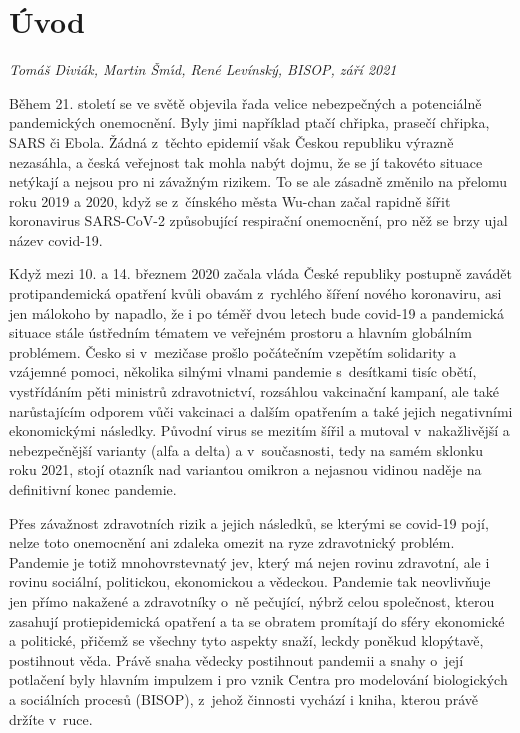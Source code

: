 \chapter*{Úvod}

\textit{Tomáš Diviák, Martin \v Sm\'\i d, René Levínský, BISOP, září 2021}
\vspace{15mm}

Během 21. století se ve světě objevila řada velice nebezpečných a potenciálně pandemických onemocnění. Byly jimi například ptačí chřipka, prasečí chřipka, SARS či Ebola. Žádná z~těchto epidemií však Českou republiku výrazně nezasáhla, a česká veřejnost tak mohla nabýt dojmu, že se jí takovéto situace netýkají a nejsou pro ni závažným rizikem. To se ale zásadně změnilo na přelomu roku 2019 a 2020, když se z~čínského města Wu-chan začal rapidně šířit koronavirus SARS-CoV-2 způsobující respirační onemocnění, pro něž se brzy ujal název covid-19.

Když mezi 10. a 14. březnem 2020 začala vláda České republiky postupně zavádět protipandemická opatření kvůli obavám z~rychlého šíření nového koronaviru, asi jen málokoho by napadlo, že i po téměř dvou letech bude covid-19 a pandemická situace stále ústředním tématem ve veřejném prostoru a hlavním globálním problémem. Česko si v~mezičase prošlo počátečním vzepětím solidarity a vzájemné pomoci, několika silnými vlnami pandemie s~desítkami tisíc obětí, vystřídáním pěti ministrů zdravotnictví, rozsáhlou vakcinační kampaní, ale také narůstajícím odporem vůči vakcinaci a dalším opatřením a také jejich negativními ekonomickými následky. Původní virus se mezitím šířil a mutoval v~nakažlivější a nebezpečnější varianty (alfa a delta) a v~současnosti, tedy na samém sklonku roku 2021, stojí otazník nad variantou omikron a nejasnou vidinou naděje na definitivní konec pandemie.

Přes závažnost zdravotních rizik a jejich následků, se kterými se covid-19 pojí, nelze toto onemocnění ani zdaleka omezit na ryze zdravotnický problém. Pandemie je totiž mnohovrstevnatý jev, který má nejen rovinu zdravotní, ale i rovinu sociální, politickou, ekonomickou a vědeckou. Pandemie tak neovlivňuje jen přímo nakažené a zdravotníky o~ně pečující, nýbrž celou společnost, kterou zasahují protiepidemická opatření a ta se obratem promítají do sféry ekonomické a politické, přičemž se všechny tyto aspekty snaží, leckdy poněkud klopýtavě, postihnout věda. Právě snaha vědecky postihnout pandemii a snahy o~její potlačení byly hlavním impulzem i pro vznik Centra pro modelování biologických a sociálních procesů (BISOP), z~jehož činnosti vychází i kniha, kterou právě držíte v~ruce.

